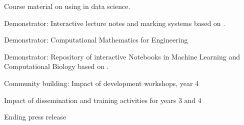 \begin{workpackage}
\begin{wpdelivs}
 \begin{wpdeliv}[due=24,id=datascience-course,dissem=PU,nature=DEC,lead=USH]{Course material on using \TheProject in data science.}
   \end{wpdeliv}
 \begin{wpdeliv}[due=36,id=lecture-notes,dissem=PU,nature=DEM,lead=USH]{Demonstrator:
     Interactive lecture notes and marking systems based on
     \TheProject.}\end{wpdeliv}
  \begin{wpdeliv}[due=47,id=ibook4,dissem=PU,nature=DEM,lead=USO]{Demonstrator:
      Computational Mathematics for Engineering} \end{wpdeliv}
 \begin{wpdeliv}[due=44,id=notebook-repo,dissem=PU,nature=DEM,lead=USH]{Demonstrator: Repository of interactive Notebooks in Machine Learning and Computational Biology based on \TheProject.}\end{wpdeliv}
 \begin{wpdeliv}[due=48,id=workshops-4,dissem=PU,nature=R,lead=PS]{Community building: Impact of development workshops, year 4}\end{wpdeliv}
 \begin{wpdeliv}[due=48,id=dissem-2,dissem=PU,nature=R,lead=PS]{Impact of dissemination and training activities for years 3 and 4}\end{wpdeliv}
\begin{wpdeliv}[due=48,id=press-release-2,dissem=PU,nature=DEC,lead=PS]{Ending press release}\end{wpdeliv}
\end{wpdelivs}


\end{workpackage}


